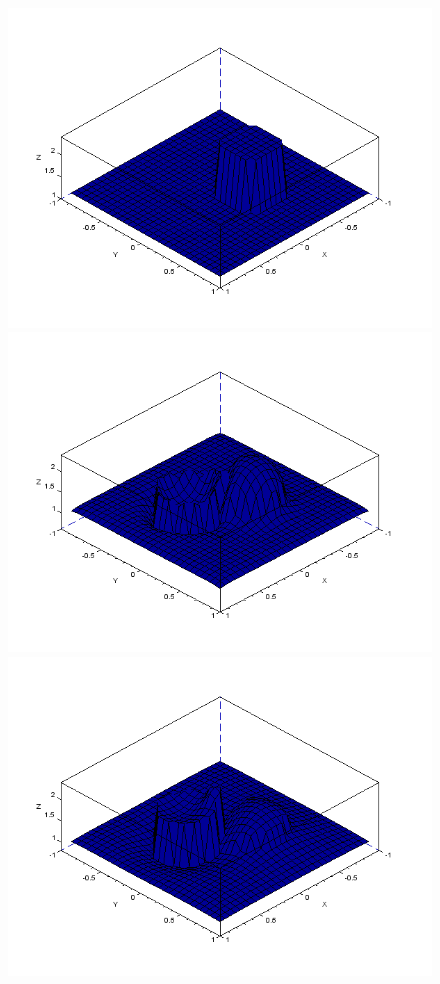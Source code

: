 \documentclass[12pt,a4paper,twoside]{article}
\begin{document}
\begin{figure}
\begin{center}
\includegraphics[scale=0.35]{Images/cercle1.png}
\includegraphics[scale=0.35]{Images/cercle2.png}
\includegraphics[scale=0.35]{Images/cercle3.png}

\end{center}
\end{figure}
\end{document}
